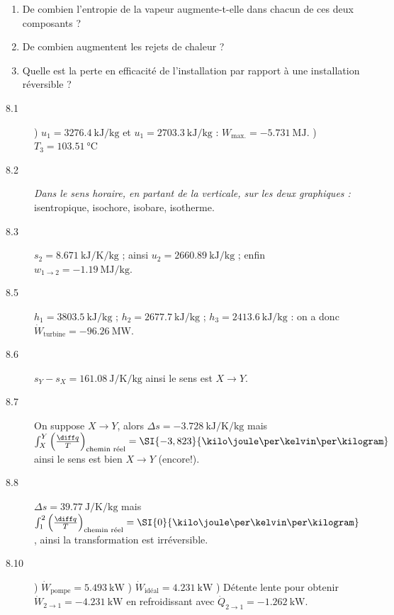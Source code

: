 	\begin{enumerate}
		\item De combien l’entropie de la vapeur augmente-t-elle dans chacun de ces deux composants ?
		\item De combien augmentent les rejets de chaleur ?
		\item Quelle est la perte en efficacité de l’installation par rapport à une installation réversible ?
	\end{enumerate}


\exercisesolutionpage
\titreresultats
	\linktosolutionsblurb

	\begin{description}
		\item [8.1] ) $u_1 = \SI{3276,4}{\kilo\joule\per\kilogram} $ et $u_1 = \SI{2703,3}{\kilo\joule\per\kilogram}$ : $W_\text{max.} = \SI{-5,731}{\mega\joule}$. 
						) $T_3 = \SI{103,51}{\degreeCelsius}$
		\item [8.2] \tab \textit{Dans le sens horaire, en partant de la verticale, sur les deux graphiques :} isentropique, isochore, isobare, isotherme.
		\item [8.3] \tab $s_2 = \SI{8,671}{\kilo\joule\per\kelvin\per\kilogram}$ ; ainsi $u_2 = \SI{2660,89}{\kilo\joule\per\kilogram}$ ; enfin $w_{1\to 2} = \SI{-1,19}{\mega\joule\per\kilogram}$.
		\item [8.5] \tab $h_1 = \SI{3803,5}{\kilo\joule\per\kilogram}$ ; $h_2 = \SI{2677,7}{\kilo\joule\per\kilogram}$ ; $h_3 = \SI{2413,6}{\kilo\joule\per\kilogram}$ : on a donc $\dot{W}_\text{turbine} = \SI{-96,26}{\mega\watt}$.
		\item [8.6] \tab $s_Y - s_X = \SI{+161,08}{\joule\per\kelvin\per\kilogram}$ ainsi le sens est $X\to Y$.
		\item [8.7] \tab On suppose $X\to Y$, alors $\Delta s = \SI{-3,728}{\kilo\joule\per\kelvin\per\kilogram}$ mais $\int_X^Y \left(\frac{\diff q}{T}\right)_\text{chemin réel} = \SI{-3,823}{\kilo\joule\per\kelvin\per\kilogram}$ ainsi le sens est bien $X\to Y$ (encore!).
		\item [8.8] \tab $\Delta s = \SI{+39,77}{\joule\per\kelvin\per\kilogram}$ mais $\int_1^2 \left(\frac{\diff q}{T}\right)_\text{chemin réel} = \SI{0}{\kilo\joule\per\kelvin\per\kilogram}$, ainsi la transformation est irréversible.
		\item [8.10] 	) $\dot{W}_\text{pompe} = \SI{+5,493}{\kilo\watt}$
							) $\dot{W}_\text{idéal} = \SI{+4,231}{\kilo\watt}$
							) Détente lente pour obtenir $\dot{W}_{2\to 1} = \SI{-4,231}{\kilo\watt}$ en refroidissant avec $\dot{Q}_{2\to 1} = \SI{-1,262}{\kilo\watt}$.

\end{description}
